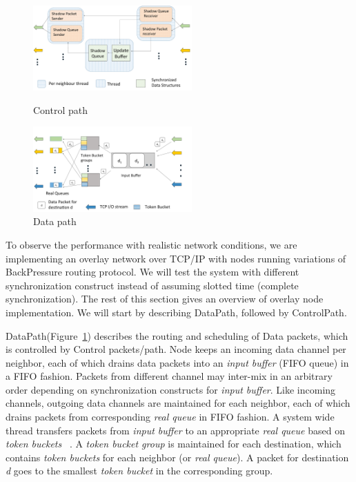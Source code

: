 \begin{figure}
\centering
\begin{minipage}[b]{0.45\linewidth}
	\includegraphics[width=2.4in]{./figures/controlpath2.pdf}
	\caption{Control path}
	\label{fig:control}
	\centering
\end{minipage}
\begin{minipage}[b]{0.45\linewidth}
	\includegraphics[width=2.4in]{./figures/datapath4.pdf}
	\caption{Data path}
	\label{fig:data} 
	\centering
\end{minipage}
\end{figure}


To observe the performance with realistic network conditions, we are implementing an overlay network over TCP/IP with nodes running variations of BackPressure routing protocol. We will test the system with different synchronization construct instead of assuming slotted time (complete synchronization). The rest of this section gives an overview of overlay node implementation. We will start by describing DataPath, followed by ControlPath.

DataPath(Figure~\ref{fig:data}) describes the routing and scheduling of Data packets, which is controlled by Control packets/path. Node keeps an incoming data channel per neighbor, each of which drains data packets into an \textit{input buffer} (FIFO queue) in a FIFO fashion. Packets from different channel may inter-mix in an arbitrary order depending on synchronization constructs for \textit{input buffer}. Like incoming channels, outgoing data channels are maintained for each neighbor, each of which drains packets from corresponding \textit{real queue} in FIFO fashion. A system wide thread transfers packets from \textit{input buffer} to an appropriate \textit{real queue} based on \textit{token buckets} ~\cite{Srikant3}. A \textit{token bucket group} is maintained for each destination, which contains \textit{token buckets} for each neighbor (or \textit{real queue}). A packet for destination \textit{d} goes to the smallest \textit{token bucket} in the corresponding group.

